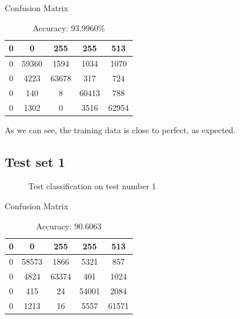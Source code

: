 \documentclass{article}
\begin{document}
\vspace{10px}
\begin{table}
\centering
Confusion Matrix\\
\begin{tabular}{c | c | c | c | c}
 0  & 0     & 255   & 255   & 513 \\\hline
 0  & 59360 & 1594  & 1034  & 1070 \\\hline
 0  & 4223  & 63678 & 317   & 724 \\\hline
 0  & 140   & 8     & 60413 & 788 \\\hline
 0  & 1302  & 0     & 3516  & 62954 \\\hline
\end{tabular}
\caption {Accuracy: 93.9960\%}
\end{table}

	As we can see, the training data is close to perfect, as expected. 
		
	\newpage
\subsection{Test set 1}
	\begin{figure}[h!]%
		\centering
    	\caption{Test classification on test number 1}%
    	\label{fig:f1}%
	\end{figure}
\begin{table}
\centering
Confusion Matrix\\
\begin{tabular}{c | c | c | c | c}
 0  & 0     & 255   & 255   & 513   \\\hline
 0  & 58573 & 1866  & 5321  & 857   \\\hline
 0  & 4824  & 63374 & 401   & 1024  \\\hline
 0  & 415   & 24    & 54001 & 2084  \\\hline
 0  & 1213  & 16    & 5557  & 61571 \\\hline
\end{tabular}
\caption {Accuracy: 90.6063}
\end{table}
\end{document}
